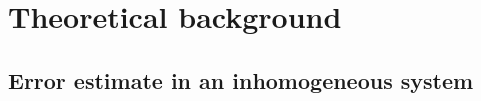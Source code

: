 \documentclass[preprint]{revtex4}
\begin{document}



\section{Theoretical background}
\subsection{Error estimate in an inhomogeneous system}
\end{document}
